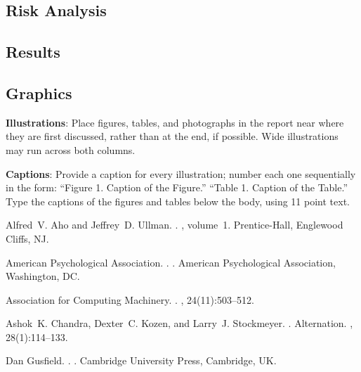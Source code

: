 \documentclass[11pt]{article}
\begin{document}
\subsection{Risk Analysis}


\subsection{Results}



\subsection{Graphics}

{\bf Illustrations}: Place figures, tables, and photographs in the
report near where they are first discussed, rather than at the end, if
possible.  Wide illustrations may run across both columns.

{\bf Captions}: Provide a caption for every illustration; number each one
sequentially in the form:  ``Figure 1. Caption of the Figure.'' ``Table 1.
Caption of the Table.''  Type the captions of the figures and 
tables below the body, using 11 point text.

\begin{thebibliography}{}

Alfred~V. Aho and Jeffrey~D. Ullman.
.
, volume~1.
\newblock Prentice-{Hall}, Englewood Cliffs, NJ.

{American Psychological Association}.
.
.
\newblock American Psychological Association, Washington, DC.

{Association for Computing Machinery}.
.
, 24(11):503--512.

Ashok~K. Chandra, Dexter~C. Kozen, and Larry~J. Stockmeyer.
.
\newblock Alternation.
,
  28(1):114--133.

Dan Gusfield.
.
.
\newblock Cambridge University Press, Cambridge, UK.

\end{thebibliography}
\end{document}
